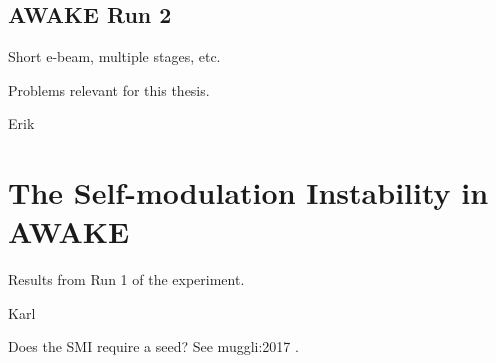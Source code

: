 \subsection{AWAKE Run 2}
\label{WFA:AWAKE:R2}

Short e-beam, multiple stages, etc.

Problems relevant for this thesis.

Erik \cite{adli:2016a}

\section{The Self-modulation Instability in AWAKE}
\label{WFA:SMI}

Results from Run 1 of the experiment.

Karl \cite{rieger:2017}

Does the SMI require a seed? See muggli:2017 \cite{muggli:2017a}.

